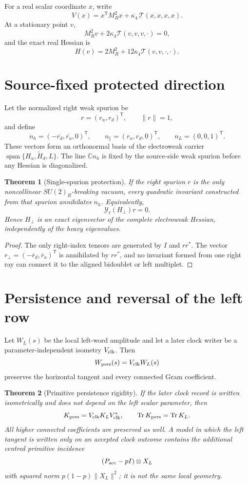 \documentclass[11pt,oneside,openany]{book}
\numberwithin{equation}{chapter}
\newtheorem{theorem}{Theorem}[chapter]
\theoremstyle{definition}
\theoremstyle{remark}
\newcommand{\C}{\mathbb C}
\newcommand{\Tr}{\operatorname{Tr}}
\newcommand{\Span}{\operatorname{span}}
\begin{document}
For a real scalar coordinate \(x\), write
\[
 V(x)=x^{\mathsf T}M_R^2x+\kappa_4\,\mathcal T(x,x,x,x).
\]
At a stationary point \(v\),
\[
 M_R^2v+2\kappa_4\mathcal T(v,v,v,\cdot)=0,
\]
and the exact real Hessian is
\[
 \boxed{
 H(v)=2M_R^2+12\kappa_4\mathcal T(v,v,\cdot,\cdot).}
\]

\section{Source-fixed protected direction}
Let the normalized right weak spurion be
\[
 r=(r_u,r_d)^{\mathsf T},
 \qquad \|r\|=1,
\]
and define
\[
 n_h=(-\overline{r_d},\overline{r_u},0)^{\mathsf T},
 \qquad
 n_\parallel=(r_u,r_d,0)^{\mathsf T},
 \qquad
 n_L=(0,0,1)^{\mathsf T}.
\]
These vectors form an orthonormal basis of the electroweak carrier
\(\Span\{H_u,\widetilde H_d,L\}\).  The line \(\C n_h\) is fixed by the
source-side weak spurion before any Hessian is diagonalized.

\begin{theorem}[Single-spurion protection]
\label{thm:single-spurion-hessian}
If the right spurion \(r\) is the only noncollinear \(SU(2)_R\)-breaking
vacuum, every quadratic invariant constructed from that spurion annihilates
\(n_h\).  Equivalently,
\[
 \mathscr Y_\ell(H_\perp)r=0.
\]
Hence \(H_\perp\) is an exact eigenvector of the complete electroweak
Hessian, independently of the heavy eigenvalues.
\end{theorem}

\begin{proof}
The only right-index tensors are generated by \(I\) and \(rr^*\).  The vector
\(r_\perp=(-\overline r_d,\overline r_u)^{\mathsf T}\) is annihilated by
\(rr^*\), and no invariant formed from one right ray can connect it to the
aligned bidoublet or left multiplet.
\end{proof}

\section{Persistence and reversal of the left row}
Let \(W_L(s)\) be the local left-word amplitude and let a later clock writer
be a parameter-independent isometry \(V_{\rm clk}\).  Then
\[
 W_{\rm pers}(s)=V_{\rm clk}W_L(s)
\]
preserves the horizontal tangent and every connected Gram coefficient.

\begin{theorem}[Primitive persistence rigidity]
\label{thm:v5-persistence}
If the later clock record is written isometrically and does not depend on the
left scalar parameter, then
\[
 K_{\rm pers}=V_{\rm clk}K_LV_{\rm clk}^*,
 \qquad
 \Tr K_{\rm pers}=\Tr K_L.
\]
All higher connected coefficients are preserved as well.  A model in which
the left tangent is written only on an accepted clock outcome contains the
additional centred primitive incidence
\[
 (P_{\rm acc}-pI)\otimes X_L
\]
with squared norm \(p(1-p)\|X_L\|^2\); it is not the same local geometry.
\end{theorem}
\end{document}
